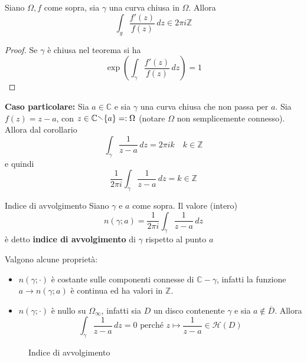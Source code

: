 \begin{corollary}
    Siano \(\Omega, f\) come sopra, sia \(\gamma\) una curva chiusa in
    \(\Omega\). Allora
    \[
      \int _{g} \frac{f'{(z)}}{f{(z)}} \,dz \in 2\pi i \mathbb{Z}
    \]
\end{corollary}
\begin{proof}
    Se \(\gamma\) è chiusa nel teorema si ha 
    \[
        \exp{\left( \int_{\gamma} \frac{f'{(z)}}{f{(z)}} \,dz \right)} = 1
    \]
\end{proof}
\textbf{Caso particolare:} Sia \(a \in \mathbb{C}\) e sia \(\gamma\) una curva
chiusa che non passa per \(a\). Sia \(f{(z)} = z-a\), con \(z \in \mathbb{C}
\sminus \{a\} =: \Omega\) (notare \(\Omega\) non semplicemente connesso). Allora
dal corollario
\[
    \int _{\gamma} \frac{1}{z-a} \,dz = 2\pi i k \quad k \in \mathbb{Z}
\]
e quindi 
\[
    \frac{1}{2\pi i} \int_{\gamma} \frac{1}{z-a} \,dz = k \in \mathbb{Z}
\]
\begin{definition}{Indice di avvolgimento}
    Siano \(\gamma\) e \(a\) come sopra. Il valore (intero) 
    \[
      n{(\gamma; a)} = \frac{1}{2\pi i} \int _{\gamma} \frac{1}{z-a} \,dz
    \] è detto \textbf{indice di avvolgimento} di \(\gamma\) rispetto al punto
    \(a\) 
\end{definition}
Valgono alcune proprietà:
\begin{itemize}[label = --]
    \item \(n{(\gamma; \cdot )}\) è costante sulle componenti connesse di
        \(\mathbb{C} - \gamma\), infatti la funzione \(a \to n{(\gamma; a)}\)  è
        continua ed ha valori in \(\mathbb{Z}\). 
    \item \(n{(\gamma; \cdot )}\) è nullo su \(\Omega_\infty\), infatti sia
        \(D\) un disco contenente \(\gamma\) e sia \(a \not\in \overline{D}\).
        Allora
        \[
          \int _{\gamma} \frac{1}{z-a} \,dz = 0 \text{ perché } z \mapsto
          \frac{1}{z-a} \in \mathcal{H}{(D)}
        \]
\end{itemize}

\begin{figure}[ht]
    \centering
    \caption{Indice di avvolgimento}
    \label{fig:indice-di-avvolgimento}
\end{figure}


